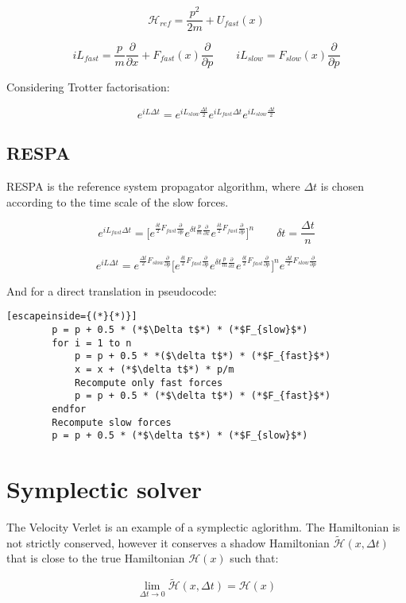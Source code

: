 	$$\mathcal{H}_{ref} = \frac{p^2}{2m} + U_{fast}(x)$$

	$$iL_{fast} = \frac{p}{m}\frac{\partial}{\partial x} + F_{fast}(x)\frac{\partial}{\partial p}\qquad iL_{slow} = F_{slow}(x)\frac{\partial}{\partial p}$$

	Considering Trotter factorisation:

	$$e^{iL\Delta t} = e^{iL_{slow}\frac{\Delta t}{2}}e^{iL_{fast}\Delta t}e^{iL_{slow}\frac{\Delta t}{2}}$$

	\subsection{RESPA}
	RESPA is the reference system propagator algorithm, where $\Delta t$ is chosen according to the time scale of the slow forces.

	$$e^{iL_{fast}\Delta t} = \biggl[e^{\frac{\delta t}{2}F_{fast}\frac{\partial}{\partial p}}e^{\delta t\frac{p}{m}\frac{\partial}{\partial x}}e^{\frac{\delta t}{2}F_{fast}\frac{\partial}{\partial p}}\biggr]^n\qquad \delta t = \frac{\Delta t}{n}$$

	$$e^{iL\Delta t} = e^{\frac{\Delta t}{2}F_{slow}\frac{\partial}{\partial p}}\biggl[e^{\frac{\delta t}{2}F_{fast}\frac{\partial}{\partial p}}e^{\delta t\frac{p}{m}\frac{\partial}{\partial x}}e^{\frac{\delta t}{2}F_{fast}\frac{\partial}{\partial p}}\biggr]^ne^{\frac{\Delta t}{2}F_{slow}\frac{\partial}{\partial p}}$$

	And for a direct translation in pseudocode:

	\begin{lstlisting}[escapeinside={(*}{*)}]
		p = p + 0.5 * (*$\Delta t$*) * (*$F_{slow}$*)
		for i = 1 to n
			p = p + 0.5 * *($\delta t$*) * (*$F_{fast}$*)
			x = x + (*$\delta t$*) * p/m
			Recompute only fast forces
			p = p + 0.5 * (*$\delta t$*) * (*$F_{fast}$*)
		endfor
		Recompute slow forces
		p = p + 0.5 * (*$\delta t$*) * (*$F_{slow}$*)
	\end{lstlisting}

\section{Symplectic solver}
The Velocity Verlet is an example of a symplectic aglorithm.
The Hamiltonian is not strictly conserved, however it conserves a shadow Hamiltonian $\tilde{\mathcal{H}}(x, \Delta t)$ that is close to the true Hamiltonian $\mathcal{H}(x)$ such that:

$$\lim\limits_{\Delta t\rightarrow 0}\tilde{\mathcal{H}}(x, \Delta t) = \mathcal{H}(x)$$
